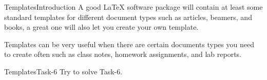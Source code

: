 \begin{frame}{Templates}{Introduction}
	A good LaTeX software package will contain at least some standard templates
	for different document types such as articles, beamers, and books, a great one will also
	let you create your own template. \vspace{1em}

	Templates can be very useful when there are certain
	documents types you need to create often such as class notes, homework assignments, and lab reports.
\end{frame}


\begin{frame}{Templates}{Task-6}
    Try to solve Task-6.\\ \pause
\end{frame}
